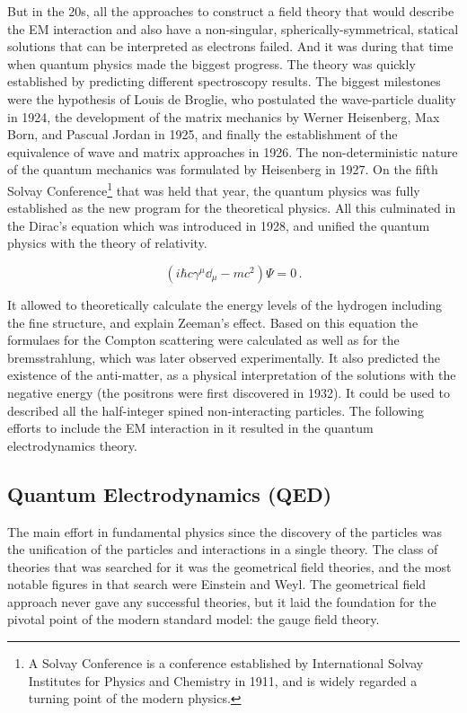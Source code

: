 But in the 20s, all the approaches to construct a field theory that would describe the EM interaction and also have a non-singular, spherically-symmetrical, statical solutions that can be interpreted as electrons failed. And it was during that time when quantum physics made the biggest progress. The theory was quickly established by predicting different spectroscopy results. The biggest milestones were the hypothesis of Louis de Broglie, who postulated the wave-particle duality in 1924, the development of the matrix mechanics by Werner Heisenberg, Max Born, and Pascual Jordan in 1925, and finally the establishment of the equivalence of wave and matrix approaches in 1926. The non-deterministic nature of the quantum mechanics was formulated by Heisenberg in 1927. On the fifth Solvay Conference\footnote{A Solvay Conference is a conference established by International Solvay Institutes for Physics and Chemistry in 1911, and is widely regarded a turning point of the modern physics.} that was held that year, the quantum physics was fully established as the new program for the theoretical physics. All this culminated in the Dirac's equation which was introduced in 1928, and unified the quantum physics with the theory of relativity.

\begin{equation}
(i \hbar c \gamma^{\mu} \dd_{\mu} - m c^{2})\Psi = 0\,.
\end{equation}

It allowed to theoretically calculate the energy levels of the hydrogen including the fine structure, and explain Zeeman's effect. Based on this equation the formulaes for the Compton scattering were calculated as well as for the bremsstrahlung, which was later observed experimentally. It also predicted the existence of the anti-matter, as a physical interpretation of the solutions with the negative energy (the positrons were first discovered in 1932). It could be used to described all the half-integer spined non-interacting particles. The following efforts to include the EM interaction in it resulted in the quantum electrodynamics theory.

\subsection{Quantum Electrodynamics (QED)}

The main effort in fundamental physics since the discovery of the particles was the unification of the particles and interactions in a single theory. The class of theories that was searched for it was the geometrical field theories, and the most notable figures in that search were Einstein and Weyl. The geometrical field approach never gave any successful theories, but it laid the foundation for the pivotal point of the modern standard model: the gauge field theory.

